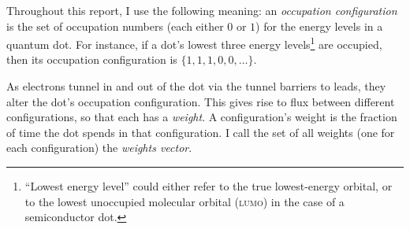 \documentclass[a4paper,11pt]{article}
\begin{document}
    Throughout this report, I use the following meaning: an \textit{occupation configuration} is the set of occupation numbers (each either $0$ or $1$) for the energy levels in a quantum dot. For instance, if a dot's lowest three energy levels\footnote{``Lowest energy level'' could either refer to the true lowest-energy orbital, or to the lowest unoccupied molecular orbital (\textsc{lumo}) in the case of a semiconductor dot.} are occupied, then its occupation configuration is $\{1,1,1,0,0,\dots\}$.

    As electrons tunnel in and out of the dot via the tunnel barriers to leads, they alter the dot's occupation configuration. This gives rise to flux between different configurations, so that each has a \textit{weight}. A configuration's weight is the fraction of time the dot spends in that configuration. I call the set of all weights (one for each configuration) the \textit{weights vector}.
\end{document}
